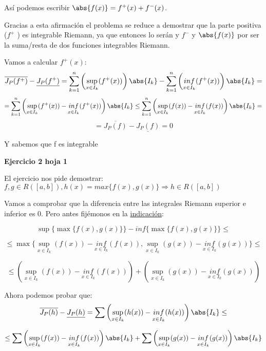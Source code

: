 \documentclass{apuntes}
\begin{document}
\begin{example}
Así podemos escribir 
$\abs{f(x)} = f^+(x)+f^-(x)$.

Gracias a esta afirmación el problema se reduce a demostrar que la parte positiva ($f^+$ ) es integrable Riemann, ya que entonces lo serán  y $f^-$  y $\abs{f(x)}$  por ser la suma/resta de dos funciones integrables Riemann.


Vamos a calcular $f^+(x)$:
\[\overline{J_P(f^+)}-\underline{J_P(f^+)} = \sum_{k=1}^n\left(\sup_{x\in I_k}(f^+(x))\right)\abs{I_k} - \sum_{k=1}^n\left(\underset{x\in I_k}{inf}(f^+(x))\right)\abs{I_k}=\]
\[= \sum_{k=1}^n\left(\sup_{x\in I_k}(f^+(x))-\underset{x\in I_k}{inf}(f^+(x))\right)\abs{I_k} \leq
\sum_{k=1}^n\left(\sup_{x\in I_k}(f(x))-\underset{x\in I_k}{inf}(f(x))\right)\abs{I_k} =\] \[=\overline{J_P(f)}-\underline{J_P(f)} = 0\]

Y sabemos que f es integrable
\end{example}

\begin{example}
\textbf{Ejercicio 2 hoja 1}

El ejercicio nos pide demostrar: $f,g \in R([a,b]), h(x) = max\lbrace f(x), g(x) \rbrace \Rightarrow h \in R([a,b])$

Vamos a comprobar que la diferencia entre las integrales Riemann superior e inferior es 0.
Pero antes fijémonos en la \underline{indicación}:

\[\sup\big\{ \max\{f(x), g(x)\}\big\} - inf\big\{ \max\{f(x), g(x)\} \big\} \leq \]

\[ \leq \max\big\{ \sup_{x \in I_k} (f(x)) - \underset{x \in I_k}{inf} (f(x)), \sup_{x \in I_k} (g(x)) - \underset{x \in I_k}{inf} (g(x)) \big\} \leq \]

\[ \leq \left(\sup_{x \in I_k} (f(x)) - \underset{x \in I_k}{inf} (f(x))\right) + \left(\sup_{x \in I_k} (g(x)) - \underset{x \in I_k}{inf} (g(x))\right) \]


Ahora podemos probar que:
\[\overline{J_P(h)}-\underline{J_P(h)}
= \sum\left(\sup_{x\in I_k}(h(x))-\underset{x\in I_k}{inf}(h(x))\right)\abs{I_k} \leq\]

\[\leq \sum\left( \sup_{x \in I_k} (f(x)) - \underset{x \in I_k}{inf} (f(x)) \right) \abs{I_k} + 
 \sum\left( \sup_{x \in I_k} (g(x)) - \underset{x \in I_k}{inf} (g(x)) \right) \abs{I_k} \]
\end{example}
\end{document}
